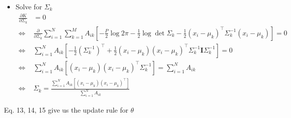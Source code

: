 \begin{itemize}
\begin{itemize}
				
			\item Solve for $\Sigma_k$
				\begin{equation}
					\begin{aligned}
						\frac{\partial K}{\partial \Sigma_k} & = 0 \\
						\iff &
							\frac{\partial}{\partial \Sigma_k} {
								\sum_{i=1}^N {
									\sum_{k=1}^M {
										A_{ik} [
											-\frac{P}{2}\log{2\pi} -\frac{1}{2} \log \det \Sigma_k - \frac{1}{2} (x_i - \mu_k)^\top\Sigma_k^{-1}(x_i - \mu_k)
										]
									}
								}
							} = 0 \\
						\iff & 
							\sum_{i = 1}^N {
								A_{ik} [
									-\frac{1}{2} (\Sigma_k^{-1})^\top 
									+\frac{1}{2} (x_i - \mu_k)(x_i - \mu_k)^\top \Sigma_k^{-1} \mathbf{I} \Sigma_k^{-1}
								]
							} = 0 \\
						\iff & 
							\sum_{i = 1}^N {
								A_{ik} [
									(x_i - \mu_k)(x_i - \mu_k)^\top \Sigma_k^{-1}
								]
							} = \sum_{i=1}^N A_{ik} \\
						\iff & 
							\Sigma_k = \frac{
								\sum_{i = 1}^N {
									A_{ik} [
										(x_i - \mu_k)(x_i - \mu_k)^\top 
									]
								} 
							}
							{
								\sum_{i = 1}^N {A_{ik}}
							}
					\end{aligned}
				\end{equation}
		\end{itemize}
\end{itemize}

Eq. 13, 14, 15 give us the update rule for $\theta$
